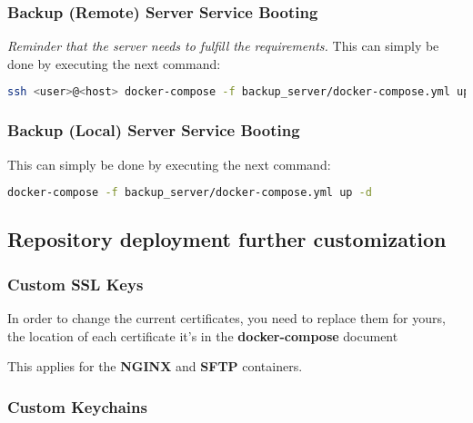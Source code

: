 \subsubsection[Backup (Remote) Server Service Booting]{Backup (Remote) Server Service Booting}
\textit{Reminder that the server needs to fulfill the requirements.}
This can simply be done by executing the next command:
\begin{lstlisting}[language=bash,label={lst:compose-up-bk-remote}]
ssh <user>@<host> docker-compose -f backup_server/docker-compose.yml up -d
\end{lstlisting}

\subsubsection[Backup (Local) Server Service Booting]{Backup (Local) Server Service Booting}
This can simply be done by executing the next command:
\begin{lstlisting}[language=bash,label={lst:compose-up-bk-Local}]
docker-compose -f backup_server/docker-compose.yml up -d
\end{lstlisting}

\newpage
\subsection{Repository deployment further customization}\label{subsec:repository-deployment-further-customization}
\subsubsection[Custom SSL Keys]{Custom SSL Keys}
\begin{flushleft}
    In order to change the current certificates, you need to replace them for yours, the location of each certificate
    it's in the \textbf{docker-compose} document

    This applies for the \textbf{NGINX} and \textbf{SFTP} containers.
\end{flushleft}

\subsubsection[Custom Keychains]{Custom Keychains}
